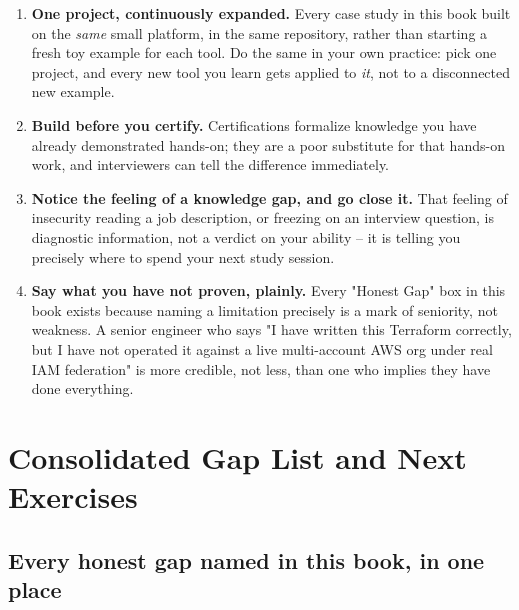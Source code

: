 \documentclass[11pt,twoside,openright]{book}
\begin{document}
\begin{enumerate}[leftmargin=2em]
  \item \textbf{One project, continuously expanded.} Every case study in this book built on
    the \emph{same} small platform, in the same repository, rather than starting a fresh
    toy example for each tool. Do the same in your own practice: pick one project, and
    every new tool you learn gets applied to \emph{it}, not to a disconnected new example.
  \item \textbf{Build before you certify.} Certifications formalize knowledge you have
    already demonstrated hands-on; they are a poor substitute for that hands-on work, and
    interviewers can tell the difference immediately.
  \item \textbf{Notice the feeling of a knowledge gap, and go close it.} That feeling of
    insecurity reading a job description, or freezing on an interview question, is
    diagnostic information, not a verdict on your ability -- it is telling you precisely
    where to spend your next study session.
  \item \textbf{Say what you have not proven, plainly.} Every "Honest Gap" box in this book
    exists because naming a limitation precisely is a mark of seniority, not weakness. A
    senior engineer who says "I have written this Terraform correctly, but I have not
    operated it against a live multi-account AWS org under real IAM federation" is more
    credible, not less, than one who implies they have done everything.
\end{enumerate}

\chapter{Consolidated Gap List and Next Exercises}

\section{Every honest gap named in this book, in one place}
\end{document}
